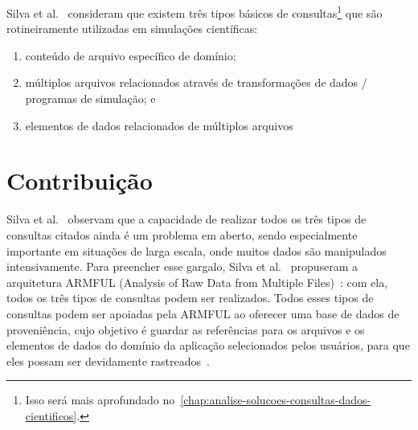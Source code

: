 
Silva et al.~\cite{silva2015analyzing} consideram que existem três tipos básicos de consultas\footnote{Isso será mais aprofundado no~\autoref{chap:analise-solucoes-consultas-dados-cientificos}.} que são rotineiramente utilizadas em simulações científicas:

\begin{enumerate}
    \item conteúdo de arquivo específico de domínio;
    \item múltiplos arquivos relacionados através de transformações de dados / programas de simulação; e
    \item elementos de dados relacionados de múltiplos arquivos
\end{enumerate}


\section{Contribuição}

Silva et al.~\cite{silva2015analyzing} observam que a capacidade de realizar todos os três tipos de consultas citados ainda é um problema em aberto, sendo especialmente importante em situações de larga escala, onde muitos dados são manipulados intensivamente.
Para preencher esse gargalo, Silva et al.~\cite{silva2015analyzing} propuseram a arquitetura  ARMFUL (Analysis of Raw Data from Multiple Files)~\cite{silva2017raw,silva2016situ}: com ela, todos os três tipos de consultas podem ser realizados. Todos esses tipos de consultas podem ser apoiadas pela ARMFUL ao oferecer uma base de dados de proveniência, cujo objetivo é guardar as referências para os arquivos e os elementos de dados do domínio da aplicação selecionados pelos usuários, para que eles possam ser devidamente rastreados~\cite{silva2015analyzing}.

